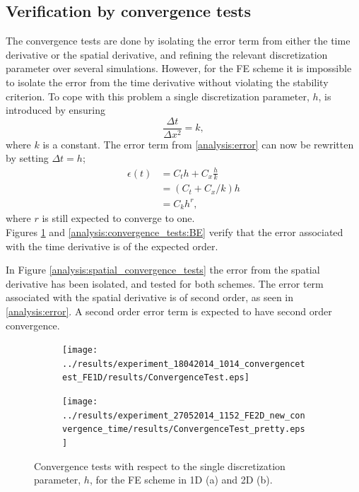 \subsection{Verification by convergence tests}

The convergence tests are done by isolating the error term from either the time derivative or the spatial derivative, and refining the relevant discretization parameter over several simulations. 
However, for the FE scheme it is impossible to isolate the error from the time derivative without violating the stability criterion. 
To cope with this problem a single discretization parameter, $h$, is introduced by ensuring  
\begin{equation*}
 \frac{\Delta t}{\Delta x^2} = k,
\end{equation*}
where $k$ is a constant. 
The error term from \eqref{analysis:error} can now be rewritten by setting $\Delta t = h$;
\begin{align*}
 \epsilon(t) &= C_t h + C_x\frac{h}{k} \\
 &= (C_t +C_x/k)h \\
 &= C_k h^r,
\end{align*}
where $r$ is still expected to converge to one.  \\

\noindent Figures \ref{analysis:convergence_tests:FE} and \ref{analysis:convergence_tests:BE} verify that the error associated with the time derivative is of the expected order. 

In Figure \ref{analysis:spatial_convergence_tests} the error from the spatial derivative has been isolated, and tested for both schemes. 
The error term associated with the spatial derivative is of second order, as seen in \eqref{analysis:error}. A second order error term is expected to have second order convergence.

\begin{figure}[h]
\centering
 \begin{subfigure}{0.49\textwidth}
  \texttt{[image: ../results/experiment\_18042014\_1014\_convergencetest\_FE1D/results/ConvergenceTest.eps]}
  \caption{}
 \end{subfigure}
 \begin{subfigure}{0.49\textwidth}
  \texttt{[image: ../results/experiment\_27052014\_1152\_FE2D\_new\_convergence\_time/results/ConvergenceTest\_pretty.eps]}
  \caption{}
 \end{subfigure}
 \caption[Convergence tests in time FE scheme]{Convergence tests with respect to the single discretization parameter, $h$, for the FE scheme in 1D (a) and 2D (b). }
 \label{analysis:convergence_tests:FE}
\end{figure}

